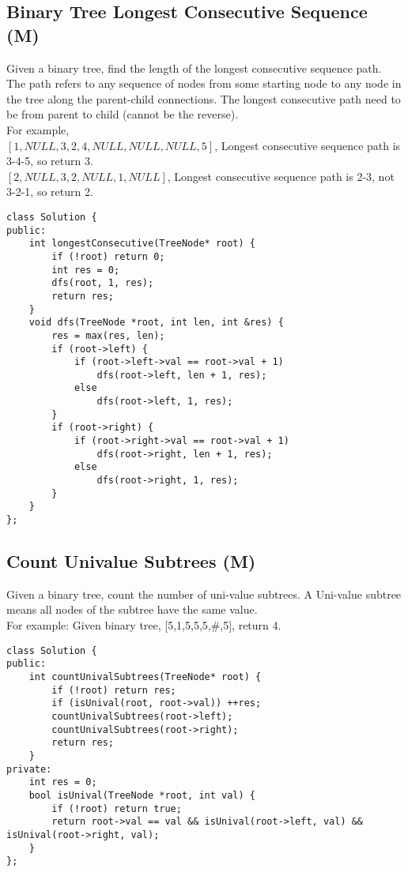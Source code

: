 \subsection{Binary Tree Longest Consecutive Sequence (M)}
Given a binary tree, find the length of the longest consecutive sequence path.\\

The path refers to any sequence of nodes from some starting node to any node in the tree along the parent-child connections. The longest consecutive path need to be from parent to child (cannot be the reverse).\\

For example, \\
$[1, NULL, 3, 2, 4, NULL, NULL, NULL, 5]$, Longest consecutive sequence path is 3-4-5, so return 3. \\
$[2, NULL, 3, 2, NULL, 1, NULL]$, Longest consecutive sequence path is 2-3, not 3-2-1, so return 2. \\

\begin{lstlisting}
class Solution {
public:
    int longestConsecutive(TreeNode* root) {
        if (!root) return 0;
        int res = 0;
        dfs(root, 1, res);
        return res;
    }
    void dfs(TreeNode *root, int len, int &res) {
        res = max(res, len);
        if (root->left) {
            if (root->left->val == root->val + 1) 
                dfs(root->left, len + 1, res);
            else 
                dfs(root->left, 1, res);
        }
        if (root->right) {
            if (root->right->val == root->val + 1) 
                dfs(root->right, len + 1, res);
            else 
                dfs(root->right, 1, res);
        }
    }
};
\end{lstlisting}


\subsection{Count Univalue Subtrees (M)}
Given a binary tree, count the number of uni-value subtrees. A Uni-value subtree means all nodes of the subtree have the same value. \\

For example: Given binary tree, [5,1,5,5,5,\#,5], return 4.\\

\begin{lstlisting}
class Solution {
public:
    int countUnivalSubtrees(TreeNode* root) {
        if (!root) return res;
        if (isUnival(root, root->val)) ++res;
        countUnivalSubtrees(root->left);
        countUnivalSubtrees(root->right);
        return res;
    }
private:
    int res = 0;
    bool isUnival(TreeNode *root, int val) {
        if (!root) return true;
        return root->val == val && isUnival(root->left, val) && isUnival(root->right, val);
    }
};
\end{lstlisting}


